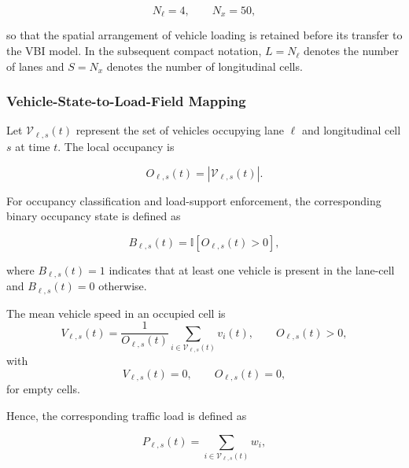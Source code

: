 \documentclass[journal]{IEEEtran}
\begin{document}
\begin{equation}
N_{\ell}=4,
\qquad
N_x=50,
\label{eq:grid_configuration}
\end{equation}

so that the spatial arrangement of vehicle loading is retained before its transfer to the VBI model. In the subsequent compact notation, $L=N_{\ell}$ denotes the number of lanes and $S=N_x$ denotes the number of longitudinal cells.





\subsubsection{Vehicle-State-to-Load-Field Mapping}
\label{subsec:load_field_mapping}

Let $\mathcal{V}_{\ell,s}(t)$ represent the set of vehicles occupying lane $\ell$ and longitudinal cell $s$ at time $t$. The local occupancy is

\begin{equation}
O_{\ell,s}(t)
=
\left|
\mathcal{V}_{\ell,s}(t)
\right|.
\label{eq:cell_occupancy}
\end{equation}

For occupancy classification and load-support enforcement, the corresponding binary occupancy state is defined as

\begin{equation}
B_{\ell,s}(t)
=
\mathbb{I}\left[O_{\ell,s}(t)>0\right],
\label{eq:binary_occupancy}
\end{equation}

where $B_{\ell,s}(t)=1$ indicates that at least one vehicle is present
in the lane-cell and $B_{\ell,s}(t)=0$ otherwise.

The mean vehicle speed in an occupied cell is
\begin{equation}
V_{\ell,s}(t)
=
\frac{1}{O_{\ell,s}(t)}
\sum_{i\in\mathcal{V}_{\ell,s}(t)}
v_i(t),
\qquad
O_{\ell,s}(t)>0,
\label{eq:mean_vehicle_speed}
\end{equation}
with
\begin{equation}
V_{\ell,s}(t)=0,
\qquad
O_{\ell,s}(t)=0,
\label{eq:empty_vehicle_speed}
\end{equation}
for empty cells.

Hence, the corresponding traffic load is defined as

\begin{equation}
P_{\ell,s}(t)
=
\sum_{i\in\mathcal{V}_{\ell,s}(t)}
w_i,
\label{eq:cell_load}
\end{equation}
\end{document}
